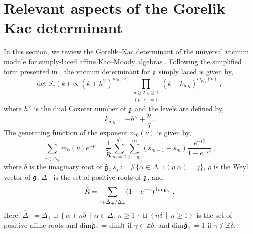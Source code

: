 \section{Relevant aspects of the Gorelik--Kac determinant} \label{sec:GKvacdet}
In this section, we review the Gorelik--Kac determinant of the universal vacuum module for simply-laced affine Kac--Moody algebras \cite{gorelik2007simplicity}. Following the simplified form presented in \cite{ArabiArdehali:2025fad}, the vacuum determinant for $\mathfrak{g}$ simply laced is given by, 
\begin{equation} \label{eq:KacGorelikvacdet}
    \text{det}~S_\nu(k) \propto (k+h^\vee)^{m_0(\nu)} \prod_{\substack{p \geqslant 2, q \geqslant 1 \\ (p,q) = 1}} (k-k_{p,q})^{m_{p/q}(\nu)}~,
\end{equation}
where $h^\vee$ is the dual Coxeter number of $\mathfrak{g}$ and the levels are defined by,
\begin{equation}
    k_{p,q} = - h^\vee + \frac{p}{q}~.
\end{equation}
The generating function of the exponent $m_0(\nu)$ is given by,
\begin{equation}
    \sum_{\nu \in \hat{\Delta}_+} m_0(\nu) e^{-\nu} = \frac{1}{\tilde{R}} \sum_{m = 2}^{h^\vee} \sum_{i = m}^\infty (s_{m-1} - s_m) \frac{e^{-i \delta}}{1 - e^{-i \delta}}~,
\end{equation}
where $\delta$ is the imaginary root of $\hat{\mathfrak{g}}$, $s_j := \# \{ \alpha \in \Delta_+ : (\rho|\alpha) = j \}$, $\rho$ is the Weyl vector of $\mathfrak{g}$, $\Delta_+$ is the set of positive roots of $\mathfrak{g}$, and
\begin{equation}
    \tilde{R} = \sum_{\gamma \in \hat{\Delta}_+ / \Delta_+} (1-e^{-\gamma})^{\text{dim} \hat{\mathfrak{g}}_\gamma}~.
\end{equation}
Here, $\hat{\Delta}_+ = \Delta_+ \sqcup \left\{\alpha + n\delta\,\middle|\,\alpha \in \Delta, \ n\geqslant 1 \right\} \sqcup \left\{n\delta \,\middle|\, n \geqslant 1 \right\}$ is the set of positive affine roots and dim$\hat{\mathfrak{g}}_\gamma$ = dim$\mathfrak{h}$ if $\gamma \in \mathbb{Z} \delta$, and dim$\hat{\mathfrak{g}}_\gamma$ = 1 if $\gamma \notin \mathbb{Z} \delta$. 

